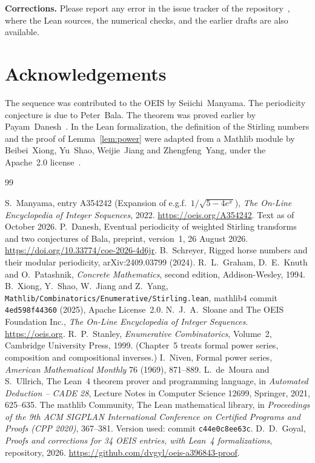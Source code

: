 \documentclass[11pt,a4paper]{article}
\theoremstyle{definition}
\theoremstyle{remark}
\newcommand{\para}[1]{\par\medskip\noindent\textbf{#1}\enspace}
\begin{document}
\para{Corrections.} Please report any error in the issue tracker of the repository~\cite{repo}, where the Lean
sources, the numerical checks, and the earlier drafts are also available.

\section*{Acknowledgements}
The sequence was contributed to the OEIS by Seiichi~Manyama. The periodicity conjecture is due to Peter~Bala. The theorem was proved earlier by
Payam~Danesh~\cite{danesh}. In the Lean formalization, the definition of the Stirling numbers and the proof of
Lemma~\ref{lem:power} were adapted from a Mathlib module by Beibei~Xiong, Yu~Shao, Weijie~Jiang and Zhengfeng~Yang, under
the Apache~2.0 license~\cite{stirlingmathlib}.

\begin{thebibliography}{99}\small
\raggedright
{} S.~Manyama, entry A354242 (Expansion of e.g.f.\ $1/\sqrt{5-4e^x}$), \emph{The On-Line Encyclopedia of Integer Sequences}, 2022. \url{https://oeis.org/A354242}. Text as of October 2026.
 P.~Danesh, Eventual periodicity of weighted Stirling transforms and two conjectures of Bala, preprint, version~1, 26 August 2026. \url{https://doi.org/10.33774/coe-2026-4d6jr}.
 B.~Schreyer, Rigged horse numbers and their modular periodicity, arXiv:2409.03799 (2024).
 R.~L.~Graham, D.~E.~Knuth and O.~Patashnik, \emph{Concrete Mathematics}, second edition, Addison-Wesley, 1994.
 B.~Xiong, Y.~Shao, W.~Jiang and Z.~Yang, \texttt{Mathlib/Combinatorics/Enumerative/Stirling.lean}, mathlib4 commit \texttt{4ed598f44360} (2025), Apache License~2.0.
 N.~J.~A.~Sloane and The OEIS Foundation Inc., \emph{The On-Line Encyclopedia of Integer Sequences}. \url{https://oeis.org}.
 R.~P.~Stanley, \emph{Enumerative Combinatorics}, Volume~2, Cambridge University Press, 1999. (Chapter~5 treats formal power series, composition and compositional inverses.)
 I.~Niven, Formal power series, \emph{American Mathematical Monthly} 76 (1969), 871--889.
 L.~de~Moura and S.~Ullrich, The Lean~4 theorem prover and programming language, in \emph{Automated Deduction -- CADE 28}, Lecture Notes in Computer Science 12699, Springer, 2021, 625--635.
 The mathlib Community, The Lean mathematical library, in \emph{Proceedings of the 9th ACM SIGPLAN International Conference on Certified Programs and Proofs (CPP 2020)}, 367--381. Version used: commit \texttt{c44e0c8ee63c}.
 D.~D.~Goyal, \emph{Proofs and corrections for 34 OEIS entries, with Lean~4 formalizations}, repository, 2026. \url{https://github.com/dvgyl/oeis-a396843-proof}.
\end{thebibliography}
\end{document}
